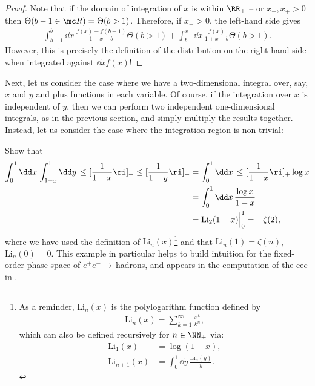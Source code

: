 \begin{example}{}
\begin{proof}
    Note that if the domain of integration of \(x\) is within \(\RR_+\) -- or \(x_-, x_+ > 0\) then \(\Theta(b-1 \in \mc R) = \Theta(b > 1)\).
    Therefore, if \(x_- > 0\), the left-hand side gives
    \begin{align}
        \int_{b-1}^b \dd x\,\frac{f(x) - f(b-1)}{1+x-b}
        \Theta(b > 1)
        +
        \int_b^{x_+} \dd x\,\frac{f(x)}{1+x-b}
        \Theta(b > 1)
        .
    \end{align}
    However, this is precisely the definition of the distribution on the right-hand side when integrated against \(\dd x f(x)\)!
\end{proof}
\end{example}



Next, let us consider the case where we have a two-dimensional integral over, say, \(x\) and \(y\) and plus functions in each variable.
%
Of course, if the integration over \(x\) is independent of \(y\), then we can perform two independent one-dimensional integrals, as in the previous section, and simply multiply the results together.
%
Instead, let us consider the case where the integration region is non-trivial:

\begin{exercise}

    Show that
    \begin{align}
        \int_{0}^{1} \dd x\,
        \int_{1-x}^{1} \dd y\,
        \le[\frac{1}{1-x}\ri]_+
        \le[\frac{1}{1-y}\ri]_+
        &=
        \int_{0}^{1} \dd x\,
        \le[\frac{1}{1-x}\ri]_+
        \log x
        \label{eq:simple_2d}
        \\
        &=
        \int_{0}^{1} \dd x\,
        \frac{\log x}{1-x}
        \notag
        \\
        &= \text{Li}_2(1-x)\Big|^1_0 = -\zeta(2)
        \label{eq:simple_2d_soln}
        ,
    \end{align}
    where we have used the definition of \(\text{Li}_n(x)\)\footnote{
        As a reminder, \(\text{Li}_n(x)\) is the polylogarithm function defined by
        \begin{align}
            \text{Li}_n(x) = \sum_{k=1}^\infty \frac{x^k}{k^n}
            ,
        \end{align}
        which can also be defined recursively for \(n \in \NN_+\) via:
        \begin{align}
            \text{Li}_1(x) &= \log(1-x)
            ,
            \\
            \text{Li}_{n+1}(x) &= \int_0^1 \dd y\, \frac{\text{Li}_n(y)}{y}
            .
        \end{align}
    } and that \(\text{Li}_n(1) = \zeta(n)\), \(\text{Li}_n(0) = 0\).
    This example in particular helps to build intuition for the fixed-order phase space of \(e^+e^-\to\,\)hadrons, and appears in the computation of the \gls{eec} in .
\end{exercise}


